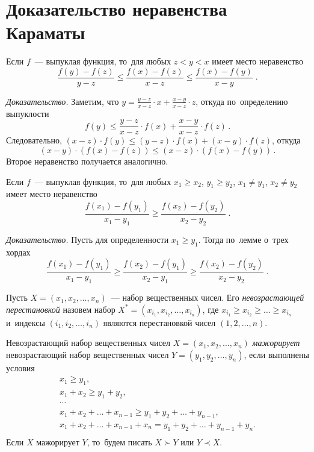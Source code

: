 

\section*{Доказательство неравенства Караматы}


Если $f$~— выпуклая функция, то~для любых $z < y < x$ имеет место неравенство
\[
    \frac{f(y) - f(z)}{y - z}
\leq
    \frac{f(x) - f(z)}{x - z}
\leq
    \frac{f(x) - f(y)}{x - y}
\; . \]

\textit{Доказательство.}
Заметим, что %
\(
    y = \frac{y - z}{x - z} \cdot x + \frac{x - y}{x - z} \cdot z
\),
откуда по~определению выпуклости
\[
    f(y)
\leq
    \frac{y - z}{x - z} \cdot f(x) + \frac{x - y}{x - z} \cdot f(z)
\, . \]
Следовательно,
$(x - z) \cdot f(y) \leq (y - z) \cdot f(x) + (x - y) \cdot f(z)$,
откуда
\[
    (x - y) \cdot (f(x) - f(z))
\leq
    (x - z) \cdot (f(x) - f(y))
\, . \]
Второе неравенство получается аналогично.

Если $f$~— выпуклая функция, то~для любых
$x_1 \geq x_2$, $y_1 \geq y_2$, $x_1 \neq y_1$, $x_2 \neq y_2$ имеет место
неравенство
\[
    \frac{f(x_1) - f(y_1)}{x_1 - y_1}
\geq
    \frac{f(x_2) - f(y_2)}{x_2 - y_2}
\; . \]

\textit{Доказательство.}
Пусть для определенности $x_1 \geq y_1$.
Тогда по~лемме о~трех хордах
\[
    \frac{f(x_1) - f(y_1)}{x_1 - y_1}
\geq
    \frac{f(x_2) - f(y_1)}{x_2 - y_1}
\geq
    \frac{f(x_2) - f(y_2)}{x_2 - y_2}
\; . \]

Пусть $X = (x_1, x_2, \ldots, x_n)$~— набор вещественных чисел.
Его \emph{невозрастающей перестановкой} назовем набор
$X^* = (x_{i_1}, x_{i_2}, \ldots, x_{i_n})$, где
$x_{i_1} \geq x_{i_2} \geq \ldots \geq x_{i_n}$
и~индексы $(i_1, i_2, \ldots, i_n)$ являются перестановкой чисел
$(1, 2, \ldots, n)$.

Невозрастающий набор вещественных чисел $X = (x_1, x_2, \ldots, x_n)$
\emph{мажорирует}
невозрастающий набор вещественных чисел $Y = (y_1, y_2, \ldots, y_n)$,
если выполнены условия
\begin{gather*}
    x_1 \geq y_1
,\\
    x_1 + x_2 \geq y_1 + y_2
,\\ \cdots \\
    x_1 + x_2 + \ldots + x_{n-1} \geq y_1 + y_2 + \ldots + y_{n-1}
,\\
    x_1 + x_2 + \ldots + x_{n-1} + x_n = y_1 + y_2 + \ldots + y_{n-1} + y_n
.\\
\end{gather*}
Если $X$ мажорирует $Y$, то~будем писать $X \succ Y$ или $Y \prec X$.

